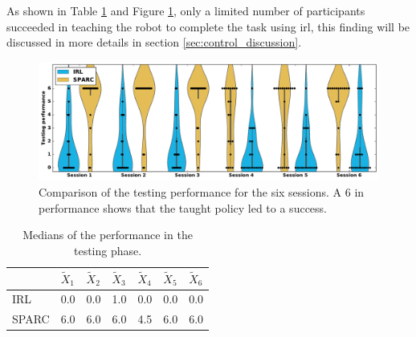 
As shown in Table \ref{tab:control_perf} and Figure \ref{fig:control_perf}, only a limited number of participants succeeded in teaching the robot to complete the task using \gls{irl}, this finding will be discussed in more details in section \ref{sec:control_discussion}.


\begin{figure}[ht]
	\includegraphics[width=\textwidth]{performance.pdf}
	\centering
	\caption{Comparison of the testing performance for the six sessions. A 6 in performance shows that the taught policy led to a success.
	}
	\label{fig:control_perf}
\end{figure}

\begin{table}[ht]
	\centering
	\caption{Medians of the performance in the testing phase.}
	\label{tab:control_perf}
	\begin{tabular}{@{}lllllll@{}}\toprule
		& $\widetilde{X}_{1}$ & $\widetilde{X}_{2}$ & $\widetilde{X}_{3}$ & $\widetilde{X}_{4}$ & $\widetilde{X}_{5}$ & $\widetilde{X}_{6}$\\ 
		\midrule
    IRL & 0.0 & 0.0 & 1.0 & 0.0 & 0.0 & 0.0\\
    SPARC & 6.0 & 6.0 & 6.0 & 4.5 & 6.0 & 6.0\\
    \bottomrule
	\end{tabular}
\end{table}

